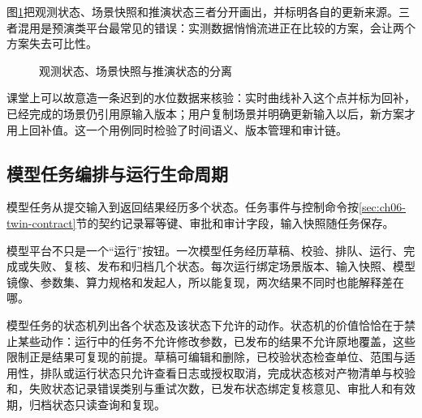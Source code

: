 图\ref{fig:twin-state-separation}把观测状态、场景快照和推演状态三者分开画出，并标明各自的更新来源。三者混用是预演类平台最常见的错误：实测数据悄悄流进正在比较的方案，会让两个方案失去可比性。

\begin{figure}[htbp]
\centering
{}
\caption{观测状态、场景快照与推演状态的分离}
\label{fig:twin-state-separation}
\end{figure}

课堂上可以故意造一条迟到的水位数据来核验：实时曲线补入这个点并标为回补，已经完成的场景仍引用原输入版本；用户复制场景并明确更新输入以后，新方案才用上回补值。这一个用例同时检验了时间语义、版本管理和审计链。

\subsection{模型任务编排与运行生命周期}\label{sec:ch08-twin-contract}

模型任务从提交输入到返回结果经历多个状态。任务事件与控制命令按\ref{sec:ch06-twin-contract}节的契约记录幂等键、审批和审计字段，输入快照随任务保存。

模型平台不只是一个“运行”按钮。一次模型任务经历草稿、校验、排队、运行、完成或失败、复核、发布和归档几个状态。每次运行绑定场景版本、输入快照、模型镜像、参数集、算力规格和发起人，所以能复现，两次结果不同时也能解释差在哪。

模型任务的状态机列出各个状态及该状态下允许的动作。状态机的价值恰恰在于禁止某些动作：运行中的任务不允许修改参数，已发布的结果不允许原地覆盖，这些限制正是结果可复现的前提。草稿可编辑和删除，已校验状态检查单位、范围与适用性，排队或运行状态只允许查看日志或授权取消，完成状态核对产物清单与校验和，失败状态记录错误类别与重试次数，已发布状态绑定复核意见、审批人和有效期，归档状态只读查询和复现。

